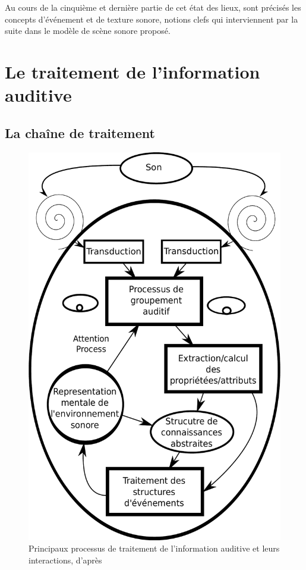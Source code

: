 Au cours de la cinquième et dernière partie de cet état des lieux, sont précisés les concepts d'événement et de texture sonore, notions clefs qui interviennent par la suite dans le modèle de scène sonore proposé.


\section{Le traitement de l'information auditive}

\subsection{La chaîne de traitement}
\label{sec:chaineTaite}

\begin{figure}[t]
        \myfloatalign
        \includegraphics[width=.6\linewidth]{gfx/ch_3/traitementSonMcAdamsBigand}
        \caption[Principaux processus de traitement de l'information auditive et leurs interactions]{Principaux processus de traitement de l'information auditive et leurs interactions, d'après \citep{mcadams1994penser}}\label{fig:traitementSonMcAdamsBigand}
\end{figure}

